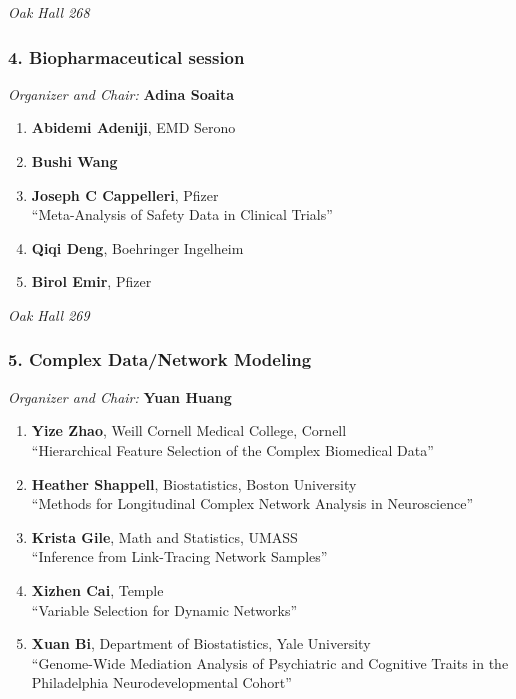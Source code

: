 \emph{Oak Hall 268} \\[.5em]

\subsubsection*{4. Biopharmaceutical session}

\emph{Organizer and Chair:} \textbf{Adina Soaita}

\begin{enumerate}
\item \textbf{Abidemi Adeniji}, EMD Serono 
\item \textbf{Bushi Wang} 
\item \textbf{Joseph C Cappelleri}, Pfizer \\
``Meta-Analysis of Safety Data in Clinical Trials''
\item \textbf{Qiqi Deng}, Boehringer Ingelheim 
\item \textbf{Birol Emir}, Pfizer 
\end{enumerate}

\emph{Oak Hall 269} \\[.5em]

\subsubsection*{5. Complex Data/Network Modeling}

\emph{Organizer and Chair:} \textbf{Yuan Huang}

\begin{enumerate}
\item \textbf{Yize Zhao}, Weill Cornell Medical College, Cornell \\
``Hierarchical Feature Selection of the Complex Biomedical Data''
\item \textbf{Heather Shappell}, Biostatistics, Boston University \\
``Methods for Longitudinal Complex Network Analysis in Neuroscience''
\item \textbf{Krista Gile}, Math and Statistics, UMASS \\
``Inference from Link-Tracing Network Samples''
\item \textbf{Xizhen Cai}, Temple \\
``Variable Selection for Dynamic Networks''
\item \textbf{Xuan Bi}, Department of Biostatistics, Yale University \\
``Genome-Wide Mediation Analysis of Psychiatric and Cognitive Traits in the Philadelphia Neurodevelopmental Cohort''
\end{enumerate}

